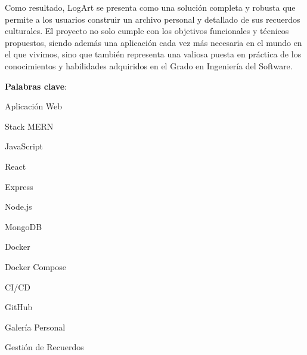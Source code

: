 \documentclass[11pt,twoside,titlepage]{report}
\begin{document}
Como resultado, LogArt se presenta como una solución completa y robusta que permite a los usuarios construir un archivo personal y detallado de sus recuerdos culturales. El proyecto no solo cumple con los objetivos funcionales y técnicos propuestos, siendo además una aplicación cada vez más necesaria en el mundo en el que vivimos, sino que también representa una valiosa puesta en práctica de los conocimientos y habilidades adquiridos en el Grado en Ingeniería del Software.

\mbox{} \bigskip

\noindent \textbf{Palabras clave}:
\begin{compactitem}
    \item Aplicación Web
    \item Stack MERN
    \item JavaScript
    \item React
    \item Express
    \item Node.js
    \item MongoDB
    \item Docker
    \item Docker Compose
    \item CI/CD
    \item GitHub
    \item Galería Personal
    \item Gestión de Recuerdos
\end{compactitem}

\afterpage{\blankpage}







\setlength{\parskip}{1pt}
\renewcommand{\baselinestretch}{1}
\renewcommand{\contentsname}{Índice de contenidos}


\tableofcontents
\afterpage{\blankpage}

\listoffigures
\afterpage{\blankpage}

\renewcommand\lstlistlistingname{Códigos}
\renewcommand\lstlistingname{Código}
\renewcommand\lstlistlistingname{Índice de códigos}
\end{document}
